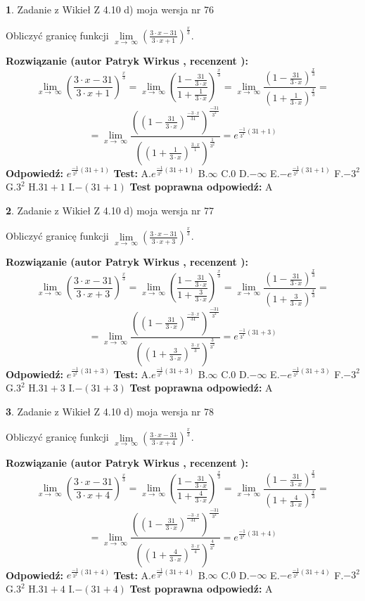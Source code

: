 \documentclass[12pt, a4paper]{article}
\theoremstyle{definition} %
\newtheorem{zad}{}
\newcommand{\zadStart}[1]{\begin{zad}#1\newline}
\newcommand{\zadStop}{\end{zad}}
\newcommand{\rozwStart}[2]{\noindent \textbf{Rozwiązanie (autor #1 , recenzent #2): }\newline}
\newcommand{\rozwStop}{\newline}
\newcommand{\odpStart}{\noindent \textbf{Odpowiedź:}\newline}
\newcommand{\odpStop}{\newline}
\newcommand{\testStart}{\noindent \textbf{Test:}\newline}
\newcommand{\testStop}{\newline}
\newcommand{\kluczStart}{\noindent \textbf{Test poprawna odpowiedź:}\newline}
\newcommand{\kluczStop}{\newline}
\begin{document}
\zadStart{Zadanie z Wikieł Z 4.10 d) moja wersja nr 76}


Obliczyć granicę funkcji  $\lim\limits_{x\to\ \infty}(\frac{3\cdot x-31}{3\cdot x+1})^{\frac{x}{3}}$.
\zadStop
\rozwStart{Patryk Wirkus}{}
$$\lim\limits_{x\to\ \infty}(\frac{3\cdot x-31}{3\cdot x+1})^{\frac{x}{3}} = \lim\limits_{x\to\ \infty}(\frac{1-\frac{31}{3\cdot x}}{1+\frac{1}{3\cdot x}})^{\frac{x}{3}}=\lim\limits_{x\to\ \infty}\frac{(1-\frac{31}{3\cdot x})^{\frac{x}{3}}}{(1+\frac{1}{3\cdot x})^{\frac{x}{3}}}=$$
$$=\lim\limits_{x\to\ \infty}\frac{((1-\frac{31}{3\cdot x})^{\frac{-3\cdot x}{31}})^{\frac{-31}{3^{2}}}}{((1+\frac{1}{3\cdot x})^{\frac{3\cdot x}{1}})^{\frac{1}{3^{2}}}}=e^{\frac{-1}{3^{2}}(31+1)}$$
\rozwStop
\odpStart
$e^{\frac{-1}{3^{2}}(31+1)}$
\odpStop
\testStart
A.$e^{\frac{-1}{3^{2}}(31+1)}$ B.$\infty$ C.$0$ D.$-\infty$ E.$-e^{\frac{-1}{3^{2}}(31+1)}$
F.$-3^{2}$ G.$3^{2}$
H.$31+1$
I.$-(31+1)$
\testStop
\kluczStart
A
\kluczStop



\zadStart{Zadanie z Wikieł Z 4.10 d) moja wersja nr 77}


Obliczyć granicę funkcji  $\lim\limits_{x\to\ \infty}(\frac{3\cdot x-31}{3\cdot x+3})^{\frac{x}{3}}$.
\zadStop
\rozwStart{Patryk Wirkus}{}
$$\lim\limits_{x\to\ \infty}(\frac{3\cdot x-31}{3\cdot x+3})^{\frac{x}{3}} = \lim\limits_{x\to\ \infty}(\frac{1-\frac{31}{3\cdot x}}{1+\frac{3}{3\cdot x}})^{\frac{x}{3}}=\lim\limits_{x\to\ \infty}\frac{(1-\frac{31}{3\cdot x})^{\frac{x}{3}}}{(1+\frac{3}{3\cdot x})^{\frac{x}{3}}}=$$
$$=\lim\limits_{x\to\ \infty}\frac{((1-\frac{31}{3\cdot x})^{\frac{-3\cdot x}{31}})^{\frac{-31}{3^{2}}}}{((1+\frac{3}{3\cdot x})^{\frac{3\cdot x}{3}})^{\frac{3}{3^{2}}}}=e^{\frac{-1}{3^{2}}(31+3)}$$
\rozwStop
\odpStart
$e^{\frac{-1}{3^{2}}(31+3)}$
\odpStop
\testStart
A.$e^{\frac{-1}{3^{2}}(31+3)}$ B.$\infty$ C.$0$ D.$-\infty$ E.$-e^{\frac{-1}{3^{2}}(31+3)}$
F.$-3^{2}$ G.$3^{2}$
H.$31+3$
I.$-(31+3)$
\testStop
\kluczStart
A
\kluczStop



\zadStart{Zadanie z Wikieł Z 4.10 d) moja wersja nr 78}


Obliczyć granicę funkcji  $\lim\limits_{x\to\ \infty}(\frac{3\cdot x-31}{3\cdot x+4})^{\frac{x}{3}}$.
\zadStop
\rozwStart{Patryk Wirkus}{}
$$\lim\limits_{x\to\ \infty}(\frac{3\cdot x-31}{3\cdot x+4})^{\frac{x}{3}} = \lim\limits_{x\to\ \infty}(\frac{1-\frac{31}{3\cdot x}}{1+\frac{4}{3\cdot x}})^{\frac{x}{3}}=\lim\limits_{x\to\ \infty}\frac{(1-\frac{31}{3\cdot x})^{\frac{x}{3}}}{(1+\frac{4}{3\cdot x})^{\frac{x}{3}}}=$$
$$=\lim\limits_{x\to\ \infty}\frac{((1-\frac{31}{3\cdot x})^{\frac{-3\cdot x}{31}})^{\frac{-31}{3^{2}}}}{((1+\frac{4}{3\cdot x})^{\frac{3\cdot x}{4}})^{\frac{4}{3^{2}}}}=e^{\frac{-1}{3^{2}}(31+4)}$$
\rozwStop
\odpStart
$e^{\frac{-1}{3^{2}}(31+4)}$
\odpStop
\testStart
A.$e^{\frac{-1}{3^{2}}(31+4)}$ B.$\infty$ C.$0$ D.$-\infty$ E.$-e^{\frac{-1}{3^{2}}(31+4)}$
F.$-3^{2}$ G.$3^{2}$
H.$31+4$
I.$-(31+4)$
\testStop
\kluczStart
A
\kluczStop
\end{document}
